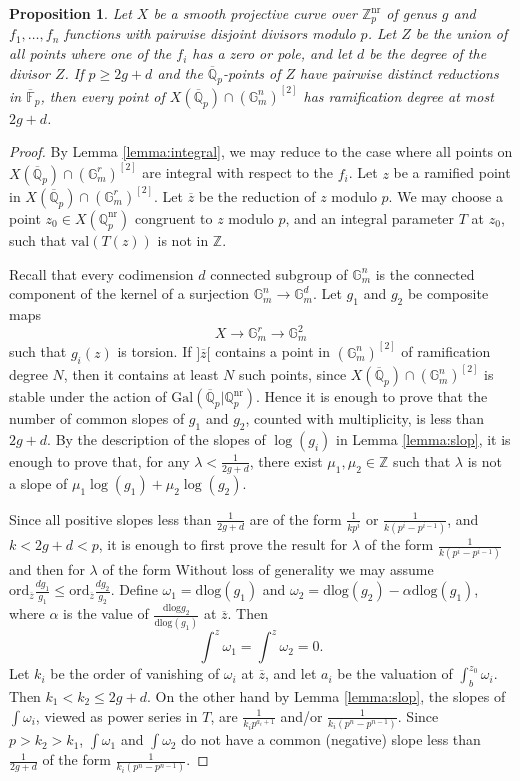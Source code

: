 \documentclass{amsart}
\def\Z{\mathbb Z}
\def\Q{\mathbb Q}
\newcommand{\ord}{\mathrm{ord}}
\newcommand{\val}{\mathrm{val}}
\newtheorem{proposition}{Proposition}
\theoremstyle{definition}
\newcommand{\Gal}{\mathrm{Gal}}
\newcommand{\nr}{\mathrm{nr}}
\newcommand{\F}{\mathbb{F}}
\newcommand{\dlog}{\mathrm{dlog}}
\begin{document}
\begin{proposition}\label{prop:ram}
Let $X$ be a smooth projective curve over $\Z _p ^{\nr }$ of genus $g$ and $f_1 ,\ldots ,f_n$ functions with pairwise disjoint divisors modulo $p$. Let $Z$ be the union of all points where one of the $f_i$ has a zero or pole, and let $d$ be the degree of the divisor $Z$. If $p\geq 2g+d$ and the $\overline{\Q }_p $-points of $Z$ have pairwise distinct reductions in $\overline{\F }_p$, then every point of $X(\overline{\Q }_p )\cap (\mathbb{G}_m ^{n})^{[2]}$ has ramification degree at most $2g+d$.
\end{proposition}
\begin{proof}
By Lemma \ref{lemma:integral}, we may reduce to the case where all points on $X(\overline {\Q }_p )\cap (\mathbb{G}_m ^{r})^{[2]}$ are integral with respect to the $f_i$. Let $z$ be a ramified point in $X(\overline{\Q }_p )\cap (\mathbb{G}_m ^r )^{[2]}$. Let $\overline{z}$ be the reduction of $z$ modulo $p$. We may choose a point $z_0 \in X(\Q _p ^{\mathrm{nr}})$ congruent to $z$ modulo $p$, and an integral parameter $T$ at $z_0$, such that $\val (T(z))$ is not in $\Z $.

Recall that every codimension $d$ connected subgroup of $\mathbb{G}_m ^n $ is the connected component of the kernel of a surjection $\mathbb{G}_m ^n \to \mathbb{G}_m ^d $. Let $g_1 $ and $g_2 $ be composite maps
\[
X\to \mathbb{G}_m ^r \to \mathbb{G}_m ^2
\]
such that $g_i (z)$ is torsion. If $]\overline{z}[$ contains a point in $(\mathbb{G}_m ^n )^{[2]}$ of ramification degree $N$, then it contains at least $N$ such points, since $X(\overline{\Q }_p )\cap (\mathbb{G}_m ^n )^{[2]}$ is stable under the action of $\Gal (\overline{\Q }_p |\Q _p ^{\nr})$. Hence it is enough to prove that the number of common slopes of $g_1 $ and $g_2$, counted with multiplicity, is less than $2g+d$. By the description of the slopes of $\log (g_i )$ in Lemma \ref{lemma:slop}, it is enough to prove that, for any $\lambda <\frac{1}{2g+d}$, there exist $\mu _1 ,\mu _2 \in \Z$ such that $\lambda $ is not a slope of $\mu _1 \log (g_1 )+\mu _2 \log (g_2 )$.

Since all positive slopes less than $\frac{1}{2g+d}$ are of the form $\frac{1}{kp^i}$ or $\frac{1}{k(p^i -p^{i-1})}$, and $k<2g+d<p$, it is enough to first prove the result for $\lambda $ of the form $\frac{1}{k(p^i-p^{i-1})}$ and then for $\lambda $ of the form
Without loss of generality we may assume $\ord _{\overline{z}}\frac{dg_1 }{g_1 }\leq \ord _{\overline{z}}\frac{dg_2 }{g_2 }$. Define $\omega _1 =\dlog (g_1 )$ and $\omega _2 =\dlog (g_2 )-\alpha \dlog (g_1 )$, where $\alpha$ is the value of $\frac{\dlog g_2 }{\dlog (g_1 )}$ at $\overline{z}$. Then 
\[
\int ^z \omega _1 =\int ^z \omega _2 =0.
\]
Let $k_i $ be the order of vanishing of $\omega _i$ at $\overline{z}$, and let $a_i$ be the valuation of $\int ^{z_0 }_b \omega _i $. Then $k_1 <k_2 \leq 2g+d$. On the other hand by Lemma \ref{lemma:slop}, the slopes of $\int \omega _i $, viewed as power series in $T$, are $\frac{1}{k_i p^{a_i +1}}$ and/or $\frac{1}{k_i (p^n-p^{n-1})}$. Since $p>k_2 >k_1 $, $\int \omega _1 $ and $\int \omega _2 $ do not have a common (negative) slope less than $\frac{1}{2g+d}$ of the form $\frac{1}{k_i (p^n-p^{n-1})}$. 


\end{proof}
\end{document}
